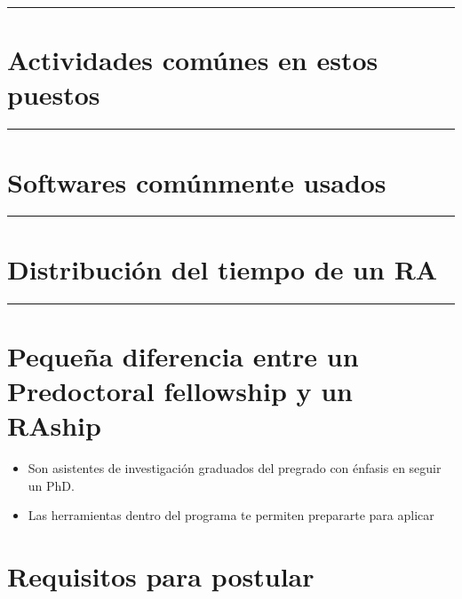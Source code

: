 \documentclass[
]{article}
\providecommand{\tightlist}{%
  \setlength{\itemsep}{0pt}\setlength{\parskip}{0pt}}
\begin{document}
\begin{center}\rule{0.5\linewidth}{0.5pt}\end{center}

\hypertarget{actividades-comuxfanes-en-estos-puestos}{%
\section{Actividades comúnes en estos
puestos}\label{actividades-comuxfanes-en-estos-puestos}}

\begin{center}\rule{0.5\linewidth}{0.5pt}\end{center}

\hypertarget{softwares-comuxfanmente-usados}{%
\section{Softwares comúnmente
usados}\label{softwares-comuxfanmente-usados}}

\begin{center}\rule{0.5\linewidth}{0.5pt}\end{center}

\hypertarget{distribuciuxf3n-del-tiempo-de-un-ra}{%
\section{Distribución del tiempo de un
RA}\label{distribuciuxf3n-del-tiempo-de-un-ra}}

\begin{center}\rule{0.5\linewidth}{0.5pt}\end{center}

\hypertarget{pequeuxf1a-diferencia-entre-un-predoctoral-fellowship-y-un-raship}{%
\section{Pequeña diferencia entre un Predoctoral fellowship y un
RAship}\label{pequeuxf1a-diferencia-entre-un-predoctoral-fellowship-y-un-raship}}

\begin{itemize}
\tightlist
\item
  Son asistentes de investigación graduados del pregrado con énfasis en
  seguir un PhD.
\item
  Las herramientas dentro del programa te permiten prepararte para
  aplicar
\end{itemize}

\hypertarget{requisitos-para-postular}{%
\section{Requisitos para postular}\label{requisitos-para-postular}}
\end{document}

